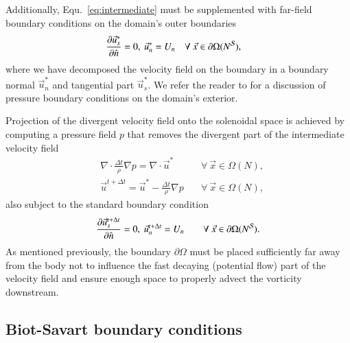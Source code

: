 \documentclass[preprint,12pt]{elsarticle}
\begin{document}
Additionally, Equ.~\ref{eq:intermediate} must be supplemented with far-field boundary conditions on the domain's outer boundaries
\begin{align}\label{eq:BC_1}
    \frac{\partial \vec{u}^*_s}{\partial \hat{n}} = 0,\ \vec{u}^*_n = U_n &\quad\forall\ \vec{x}\in\partial\Omega (N^{\cal S}),
\end{align}
where we have decomposed the velocity field on the boundary in a boundary normal $\vec{u}^*_n$ and tangential part $\vec{u}^*_s$. We refer the reader to \cite{Gresho1987} for a discussion of pressure boundary conditions on the domain's exterior.

Projection of the divergent velocity field onto the solenoidal space is achieved by computing a pressure field $p$ that removes the divergent part of the intermediate velocity field
\begin{align}\label{eq:poisson}
      &\nabla\cdot\frac{\Delta t}{\rho}\nabla p = \nabla\cdot \vec{u}^* &\quad\forall\ \vec{x}\in\Omega (N),\\
      &\vec{u}^{t+\Delta t} = \vec{u}^*-\frac{\Delta t}{\rho}\nabla p &\quad\forall\ \vec{x}\in\Omega (N),
\end{align}
also subject to the standard boundary condition
\begin{align}\label{eq:BC_2}
      &\frac{\partial \vec{u}^{t+\Delta t}_s}{\partial \hat{n}} = 0,\ \vec{u}^{t+\Delta t}_n = U_n &\quad\forall\ \vec{x}\in\partial\Omega (N^{\cal S}).
\end{align}
As mentioned previously, the boundary $\partial\Omega$ must be placed sufficiently far away from the body not to influence the fast decaying (potential flow) part of the velocity field and ensure enough space to properly advect the vorticity downstream. 

\subsection{Biot-Savart boundary conditions}

\end{document}
